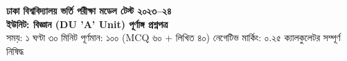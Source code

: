 \documentclass[11pt,oneside]{scrbook}
\begin{document}
\thispagestyle{empty}


\begin{examheader}
    {\LARGE\bfseries\color{white} ঢাকা বিশ্ববিদ্যালয় ভর্তি পরীক্ষা মডেল টেস্ট ২০২৩--২৪}\\[3pt]
    {\large\bfseries\color{HiveGold} ইউনিট: বিজ্ঞান (DU 'A' Unit) \textbar{} পূর্ণাঙ্গ প্রশ্নপত্র}\\[4pt]
    {\footnotesize\color{white} সময়: ১ ঘণ্টা ৩০ মিনিট \textbar{} পূর্ণমান: ১০০ (MCQ ৬০ + লিখিত ৪০) \textbar{} নেগেটিভ মার্কিং: ০.২৫ \textbar{} ক্যালকুলেটর সম্পূর্ণ নিষিদ্ধ}
\end{examheader}
\end{document}
